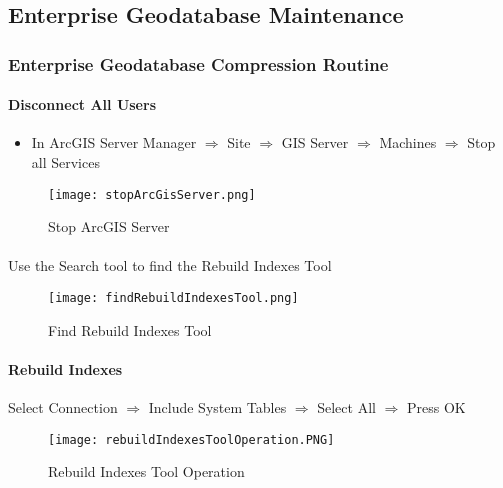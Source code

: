 \documentclass[class=article , crop=false, titlepage, twoside, multi={itemize, figure, verbatim}, float=false]{standalone}
\title{}  %
\begin{document}
\ifstandalone
\frontmatter %
\maketitle %
\tableofcontents %
\clearpage
\mainmatter %
\fi
\subsection{Enterprise Geodatabase Maintenance}
\subsubsection{Enterprise Geodatabase Compression Routine}
\paragraph[Disconnect Users]{Disconnect All Users\texorpdfstring{\\}{}}
\begin{itemize}
\item In ArcGIS Server Manager $\Rightarrow$  Site $\Rightarrow$ GIS Server $\Rightarrow$ Machines $\Rightarrow$ Stop all Services
\end{itemize}
\begin{figure}[h!]
\centering
    \texttt{[image: stopArcGisServer.png]}
\vspace*{-10mm}\caption{Stop ArcGIS Server}

\end{figure}
\paragraph*{}Use the Search tool to find the Rebuild Indexes Tool
\begin{figure}[h!]
\centering
    \texttt{[image: findRebuildIndexesTool.png]}
\vspace*{-10mm}\caption{Find Rebuild Indexes Tool}

\end{figure}
\clearpage
\paragraph[Rebuild Indexes]{Rebuild Indexes\texorpdfstring{\\}{}}
\noindent Select Connection $\Rightarrow$  Include System Tables $\Rightarrow$ Select All $\Rightarrow$ Press OK
\begin{figure}[h!]
\centering
	\texttt{[image: rebuildIndexesToolOperation.PNG]}
\caption{Rebuild Indexes Tool Operation}
\end{figure}
\clearpage
\end{document}
